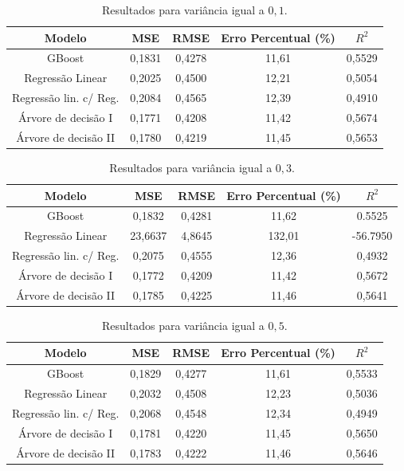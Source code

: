 \begin{table}[htpb!]
    \centering
    \caption{Resultados para variância igual a $0,1$.}
    \label{tab:var01}
    \begin{tabular}{@{}ccccc@{}}
    \toprule
    Modelo                 & MSE    & RMSE   & Erro Percentual (\%) & $R^2$  \\ \midrule
    GBoost                 & 0,1831 & 0,4278 & 11,61                & 0,5529 \\
    Regressão Linear       & 0,2025 & 0,4500 & 12,21                & 0,5054 \\
    Regressão lin. c/ Reg. & 0,2084 & 0,4565 & 12,39                & 0,4910 \\
    Árvore de decisão I    & 0,1771 & 0,4208 & 11,42                & 0,5674 \\
    Árvore de decisão II   & 0,1780 & 0,4219 & 11,45                & 0,5653 \\ \bottomrule
    \end{tabular}
\end{table}
\begin{table}[htpb!]
    \centering
    \caption{Resultados para variância igual a $0,3$.}
    \label{tab:var03}
    \begin{tabular}{@{}ccccc@{}}
    \toprule
    Modelo                 & MSE    & RMSE   & Erro Percentual (\%) & $R^2$  \\ \midrule
    GBoost                 & 0,1832 & 0,4281 & 11,62                & 0.5525 \\
    Regressão Linear       & 23,6637 & 4,8645 & 132,01                & -56.7950 \\
    Regressão lin. c/ Reg. & 0,2075 & 0,4555 & 12,36                & 0,4932 \\
    Árvore de decisão I    & 0,1772 & 0,4209 & 11,42                & 0,5672 \\
    Árvore de decisão II   & 0,1785 & 0,4225 & 11,46                & 0,5641 \\ \bottomrule
    \end{tabular}
\end{table}
\begin{table}[htpb!]
    \centering
    \caption{Resultados para variância igual a $0,5$.}
    \label{tab:var05}
    \begin{tabular}{@{}ccccc@{}}
    \toprule
    Modelo                 & MSE    & RMSE   & Erro Percentual (\%) & $R^2$  \\ \midrule
    GBoost                 & 0,1829 & 0,4277 & 11,61 & 0,5533 \\
    Regressão Linear       & 0,2032 & 0,4508 & 12,23 & 0,5036 \\
    Regressão lin. c/ Reg. & 0,2068 & 0,4548 & 12,34 & 0,4949 \\
    Árvore de decisão I    & 0,1781 & 0,4220 & 11,45 & 0,5650 \\
    Árvore de decisão II   & 0,1783 & 0,4222 & 11,46 & 0,5646 \\
    \bottomrule
    \end{tabular}
\end{table}
